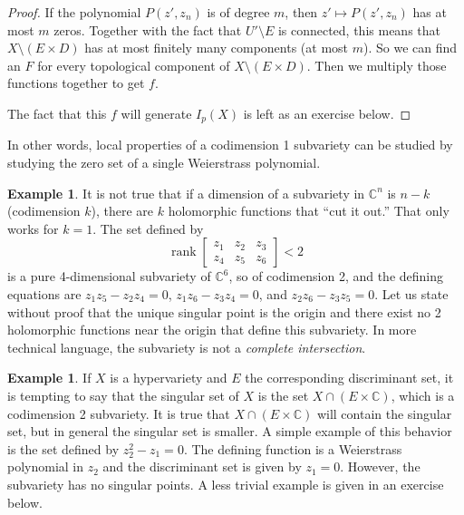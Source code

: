\documentclass[12pt,openany]{book}
\newcommand{\C}{{\mathbb{C}}}
\newcommand{\rank}{\operatorname{rank}}
\newcommand{\myindex}[1]{#1\index{#1}}
\theoremstyle{plain}
\theoremstyle{remark}
\theoremstyle{definition}
\theoremstyle{exercise}
\theoremstyle{example}
\newtheorem{example}[thm]{Example}
\begin{document}
\begin{proof}
If the polynomial $P(z',z_n)$ is of degree $m$,
then $z' \mapsto P(z',z_n)$ has at most $m$ zeros.  Together with
the fact that $U' \setminus E$ is connected, this means that
$X \setminus (E \times D)$ has at most finitely many components (at
most $m$).
So we can find an $F$ for every topological component of
$X \setminus ( E \times D )$.  Then we multiply those functions together
to get $f$.

The fact that this $f$ will generate $I_p(X)$ is left as an exercise below.
\end{proof}

In other words, local properties of a codimension 1 subvariety can be
studied by studying the zero set of a single Weierstrass polynomial.

\begin{example}
It is not true that
if a dimension of a subvariety in $\C^n$ is $n-k$ (codimension $k$),
there are $k$
holomorphic functions that ``cut it out.''  That only works for $k=1$.
The set defined by
\begin{equation*}
\rank
\begin{bmatrix}
z_1 & z_2 & z_3 \\
z_4 & z_5 & z_6
\end{bmatrix}
< 2
\end{equation*}
is a pure 4-dimensional subvariety of $\C^6$, so of codimension 2,
and the defining equations are
$z_1z_5-z_2z_4 = 0$,
$z_1z_6-z_3z_4 = 0$, and
$z_2z_6-z_3z_5 = 0$.  Let us state without proof that the unique singular point is the origin and there exist
no 2 holomorphic functions near the origin
that define this subvariety.  In more technical
language, the subvariety is not a \emph{\myindex{complete intersection}}.
\end{example}

\begin{example}
If $X$ is a hypervariety and $E$ the corresponding discriminant set,
it is tempting to say that the singular set of $X$ is the
set $X \cap (E \times \C)$, which is a codimension 2 subvariety.  It is true that
$X \cap (E \times \C)$ will contain the singular set, but in general the
singular set is smaller.
A simple example of this behavior is the set defined by
$z_2^2 - z_1 = 0$.  The defining function is a Weierstrass
polynomial in $z_2$ and the discriminant set is given by $z_1 = 0$.
However, the subvariety has no singular points.  A less trivial example
is given in an exercise below.
\end{example}
\end{document}
